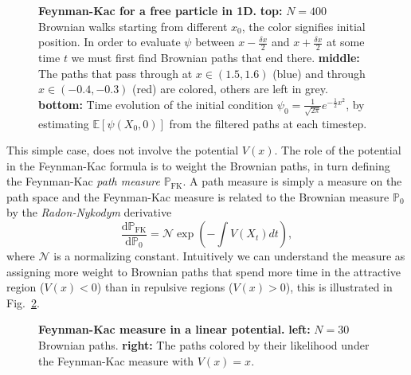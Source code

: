 \begin{figure}[h]
	\caption[Feynman-Kac for a free particle in 1D]{\textbf{Feynman-Kac for a free particle  in 1D.} \textbf{top:} $N=400$ Brownian walks starting from different $x_0$, the color signifies initial position. In order to evaluate $\psi$ between $x-\frac{\delta x}{2}$ and $x+\frac{\delta x}{2}$ at some time $t$ we must first find Brownian paths that end there. \textbf{middle:} The paths that pass through at $x \in (1.5, 1.6)$ (blue) and through $x \in (-0.4,-0.3)$ (red) are colored, others are left in grey. \textbf{bottom:} Time evolution of the initial condition $\psi_{0} = \frac{1}{\sqrt{2 \pi}} e^{-\frac{1}{2} x^{2}}$, by estimating ${\mathbb{E}}\left[\psi\left(X_{0}, 0\right)\right]$ from the filtered paths at each timestep.}
	\label{fig:fk_1d_example}
\end{figure}
This simple case, does not involve the potential $V(x)$. The role of the potential in the Feynman-Kac formula is to weight the Brownian paths, in turn defining the Feynman-Kac \emph{path measure} $\mathbb{P}_{\mathrm{FK}}$. A path measure is simply a measure on the path space and the Feynman-Kac measure is related to the Brownian measure $\mathbb{P}_{0}$ by the \emph{Radon-Nykodym} derivative
\begin{equation}
	\frac{\mathrm{d} \mathbb{P}_{\mathrm{FK}}}{\mathrm{d} \mathbb{P}_{0}}=\mathcal{N} \exp \left(-\int V\left(X_{t}\right) d t\right),
\end{equation}
where $\mathcal{N}$ is a normalizing constant. Intuitively we can understand the measure as assigning more weight to Brownian paths that spend more time in the attractive region ($V(x) < 0$) than in repulsive regions ($V(x) > 0$), this is illustrated in Fig.~\ref{fig:fkac_measure_reweight}.
\begin{figure}[H]
	\centering
	\caption[Feynman-Kac measure in a linear potential]{\textbf{Feynman-Kac measure in a linear potential.} 
		\textbf{left:} $N=30$ Brownian paths. \textbf{right:} The paths colored by their likelihood under the Feynman-Kac measure with $V(x)=x$. }
	\label{fig:fkac_measure_reweight}
\end{figure}
